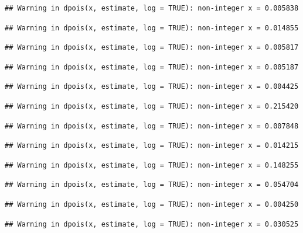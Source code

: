 \documentclass[]{article}
\begin{document}
\begin{verbatim}
## Warning in dpois(x, estimate, log = TRUE): non-integer x = 0.005838
\end{verbatim}

\begin{verbatim}
## Warning in dpois(x, estimate, log = TRUE): non-integer x = 0.014855
\end{verbatim}

\begin{verbatim}
## Warning in dpois(x, estimate, log = TRUE): non-integer x = 0.005817
\end{verbatim}

\begin{verbatim}
## Warning in dpois(x, estimate, log = TRUE): non-integer x = 0.005187
\end{verbatim}

\begin{verbatim}
## Warning in dpois(x, estimate, log = TRUE): non-integer x = 0.004425
\end{verbatim}

\begin{verbatim}
## Warning in dpois(x, estimate, log = TRUE): non-integer x = 0.215420
\end{verbatim}

\begin{verbatim}
## Warning in dpois(x, estimate, log = TRUE): non-integer x = 0.007848
\end{verbatim}

\begin{verbatim}
## Warning in dpois(x, estimate, log = TRUE): non-integer x = 0.014215
\end{verbatim}

\begin{verbatim}
## Warning in dpois(x, estimate, log = TRUE): non-integer x = 0.148255
\end{verbatim}

\begin{verbatim}
## Warning in dpois(x, estimate, log = TRUE): non-integer x = 0.054704
\end{verbatim}

\begin{verbatim}
## Warning in dpois(x, estimate, log = TRUE): non-integer x = 0.004250
\end{verbatim}

\begin{verbatim}
## Warning in dpois(x, estimate, log = TRUE): non-integer x = 0.030525
\end{verbatim}
\end{document}
